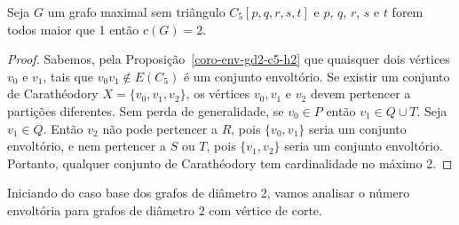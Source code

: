 \begin{coro}
\label{coro-carat-gd2-c5-h2}
    Seja $G$ um grafo maximal sem triângulo $C_5[p,q,r,s,t]$ e $p$, $q$, $r$, $s$ e $t$ forem todos maior que 1 então $c(G) = 2$.
\end{coro}
\begin{proof}

Sabemos, pela Proposição~\ref{coro-env-gd2-c5-h2} que quaisquer dois vértices $v_0$ e $v_1$, tais que $v_0v_1 \notin E(C_5)$ é um conjunto envoltório. Se existir um conjunto de Carathéodory $X=\{v_0, v_1, v_2\}$, os vértices $v_0, v_1$ e $v_2$ devem pertencer a partições diferentes. Sem perda de generalidade, se $v_0 \in P$ então $v_1 \in Q \cup T$. Seja $v_1 \in Q$. Então $v_2$ não pode pertencer a $R$, pois $\{v_0, v_1\}$ seria um conjunto envoltório, e nem pertencer a $S$ ou $T$, pois $\{v_1,v_2\}$ seria um conjunto envoltório. Portanto, qualquer conjunto de Carathéodory tem cardinalidade no máximo 2.
\end{proof}


Iniciando do caso base dos grafos de diâmetro 2, vamos analisar o número envoltória para grafos de diâmetro 2 com vértice de corte.

